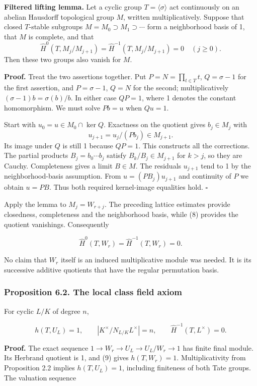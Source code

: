 \documentclass[11pt,a4paper]{article}
\begin{document}
\textbf{Filtered lifting lemma.} Let a cyclic group
\(T=\langle\sigma\rangle\) act continuously on an abelian Hausdorff
topological group \(M\), written multiplicatively. Suppose that closed
\(T\)-stable subgroups \(M=M_0\supset M_1\supset\cdots\) form a
neighborhood basis of 1, that \(M\) is complete, and that \[
\widehat H^0(T,M_j/M_{j+1})=
\widehat H^{-1}(T,M_j/M_{j+1})=0
\quad(j\geq0).
\] Then these two groups also vanish for \(M\).

\textbf{Proof.} Treat the two assertions together. Put
\(P=N=\prod_{t\in T}t\), \(Q=\sigma-1\) for the first assertion, and
\(P=\sigma-1\), \(Q=N\) for the second; multiplicatively
\((\sigma-1)b=\sigma(b)/b\). In either case \(QP=1\), where 1 denotes
the constant homomorphism. We must solve \(Pb=u\) when \(Qu=1\).

Start with \(u_0=u\in M_0\cap\ker Q\). Exactness on the quotient gives
\(b_j\in M_j\) with \[
u_{j+1}=u_j/(Pb_j)\in M_{j+1}.
\] Its image under \(Q\) is still 1 because \(QP=1\). This constructs
all the corrections. The partial products \(B_j=b_0\cdots b_j\) satisfy
\(B_k/B_j\in M_{j+1}\) for \(k>j\), so they are Cauchy. Completeness
gives a limit \(B\in M\). The residuals \(u_{j+1}\) tend to 1 by the
neighborhood-basis assumption. From \(u=(PB_j)u_{j+1}\) and continuity
of \(P\) we obtain \(u=PB\). Thus both required kernel-image equalities
hold. \(\square\)

Apply the lemma to \(M_j=W_{r+j}\). The preceding lattice estimates
provide closedness, completeness and the neighborhood basis, while (8)
provides the quotient vanishings. Consequently

\[
\widehat H^0(T,W_r)=\widehat H^{-1}(T,W_r)=0.
\tag{9}
\]

No claim that \(W_r\) itself is an induced multiplicative module was
needed. It is its successive additive quotients that have the regular
permutation basis.

\subsubsection{Proposition 6.2. The local class field
axiom}\label{proposition-6.2.-the-local-class-field-axiom}

For cyclic \(L/K\) of degree \(n\),

\[
h(T,U_L)=1,\qquad
|K^\times/N_{L/K}L^\times|=n,\qquad
\widehat H^{-1}(T,L^\times)=0.
\tag{10}
\]

\textbf{Proof.} The exact sequence \(1\to W_r\to U_L\to U_L/W_r\to1\)
has finite final module. Its Herbrand quotient is 1, and (9) gives
\(h(T,W_r)=1\). Multiplicativity from Proposition 2.2 implies
\(h(T,U_L)=1\), including finiteness of both Tate groups. The valuation
sequence
\end{document}
